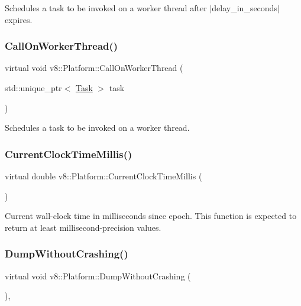 Schedules a task to be invoked on a worker thread after $\vert$delay\+\_\+in\+\_\+seconds$\vert$ expires. \mbox{\label{classv8_1_1Platform_a92dc9c2f54c9a0fea87e15df8d58d699}} 
\subsubsection{\texorpdfstring{Call\+On\+Worker\+Thread()}{CallOnWorkerThread()}}
{\footnotesize\ttfamily virtual void v8\+::\+Platform\+::\+Call\+On\+Worker\+Thread (\begin{DoxyParamCaption}\item[{std\+::unique\+\_\+ptr$<$ \mbox{\hyperlink{classv8_1_1Task}{Task}} $>$}]{task }\end{DoxyParamCaption})\hspace{0.3cm}{\ttfamily [pure virtual]}}

Schedules a task to be invoked on a worker thread. \mbox{\label{classv8_1_1Platform_a8aa46c7f8e492351ebe1bc8168ec9c2f}} 
\subsubsection{\texorpdfstring{Current\+Clock\+Time\+Millis()}{CurrentClockTimeMillis()}}
{\footnotesize\ttfamily virtual double v8\+::\+Platform\+::\+Current\+Clock\+Time\+Millis (\begin{DoxyParamCaption}{ }\end{DoxyParamCaption})\hspace{0.3cm}{\ttfamily [pure virtual]}}

Current wall-\/clock time in milliseconds since epoch. This function is expected to return at least millisecond-\/precision values. \mbox{\label{classv8_1_1Platform_abcbf846fdfc791569f64de675d522cac}} 
\subsubsection{\texorpdfstring{Dump\+Without\+Crashing()}{DumpWithoutCrashing()}}
{\footnotesize\ttfamily virtual void v8\+::\+Platform\+::\+Dump\+Without\+Crashing (\begin{DoxyParamCaption}{ }\end{DoxyParamCaption})\hspace{0.3cm}{\ttfamily [inline]}, {\ttfamily [virtual]}}

